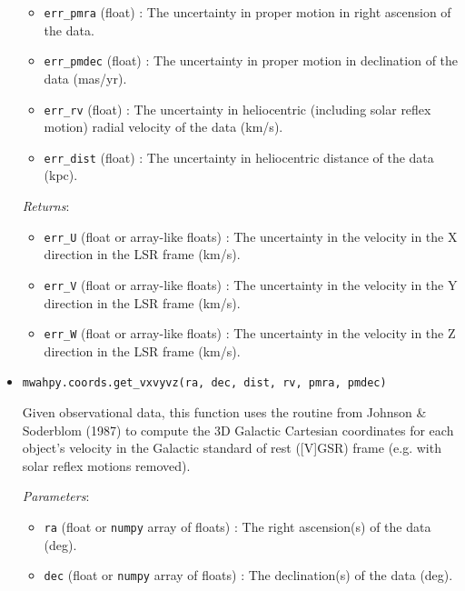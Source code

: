 \documentclass{article}
\begin{document}
\begin{itemize}
\begin{itemize}
\item \verb!err_pmra! (float) : The uncertainty in proper motion in right ascension of the data.

\item \verb!err_pmdec! (float) : The uncertainty in proper motion in declination of the data (mas/yr).

\item \verb!err_rv! (float) : The uncertainty in heliocentric (including solar reflex motion) radial velocity of the data (km/s).

\item \verb!err_dist! (float) : The uncertainty in heliocentric distance of the data (kpc).

\end{itemize}

\textit{Returns}: \begin{itemize}

\item \verb!err_U! (float or array-like floats) : The uncertainty in the velocity in the X direction in the LSR frame (km/s).

\item \verb!err_V! (float or array-like floats) : The uncertainty in the velocity in the Y direction in the LSR frame (km/s).

\item \verb!err_W! (float or array-like floats) : The uncertainty in the  velocity in the Z direction in the LSR frame (km/s).

\end{itemize}



\item \verb!mwahpy.coords.get_vxvyvz(ra, dec, dist, rv, pmra, pmdec)!

Given observational data, this function uses the routine from Johnson \& Soderblom (1987) to compute the 3D Galactic Cartesian coordinates for each object's velocity in the Galactic standard of rest ([V]GSR) frame (e.g. with solar reflex motions removed).

\textit{Parameters}: \begin{itemize}

\item \verb!ra! (float or \verb!numpy! array of floats) : The right ascension(s) of the data (deg).

\item \verb!dec! (float or \verb!numpy! array of floats) : The declination(s) of the data (deg).


\end{itemize}
\end{itemize}
\end{document}
